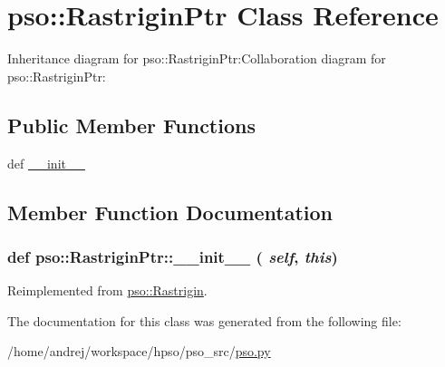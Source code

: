 \hypertarget{classpso_1_1RastriginPtr}{
\section{pso::RastriginPtr Class Reference}
\label{classpso_1_1RastriginPtr}
}
Inheritance diagram for pso::RastriginPtr:Collaboration diagram for pso::RastriginPtr:\subsection*{Public Member Functions}
\begin{CompactItemize}
\item 
def \hyperlink{classpso_1_1RastriginPtr_e68fff937daab154626622e257267a58}{\_\-\_\-init\_\-\_\-}
\end{CompactItemize}


\subsection{Member Function Documentation}
\hypertarget{classpso_1_1RastriginPtr_e68fff937daab154626622e257267a58}{
\subsubsection{\setlength{\rightskip}{0pt plus 5cm}def pso::RastriginPtr::\_\-\_\-init\_\-\_\- ( {\em self}, \/   {\em this})}}
\label{classpso_1_1RastriginPtr_e68fff937daab154626622e257267a58}




Reimplemented from \hyperlink{classpso_1_1Rastrigin_6a38343c1d2870431835ecb1a82d43b2}{pso::Rastrigin}.

The documentation for this class was generated from the following file:\begin{CompactItemize}
\item 
/home/andrej/workspace/hpso/pso\_\-src/\hyperlink{pso_8py}{pso.py}\end{CompactItemize}
